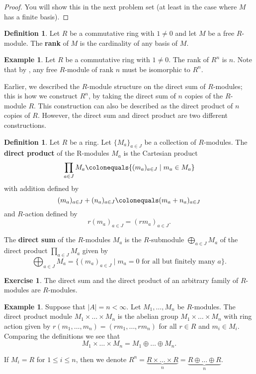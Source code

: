 \documentclass[12pt]{report}
\numberwithin{equation}{section}
\numberwithin{theorem}{chapter}
\theoremstyle{definition}
\newtheorem{definition}[theorem]{Definition}
\newtheorem{example}[theorem]{Example}
\newtheorem{exercise}{Exercise}
\newtheorem*{basic properties}{Basic Properties}
\newtheorem*{Important Remark}{Important Remark}
\newcommand{\df}[1]{{\bf #1}\index{#1}}
\begin{document}
\begin{proof}
You will show this in the next problem set (at least in the case where $M$ has a finite basis).
\end{proof}


\begin{definition}
Let $R$ be a commutative ring with $1\neq 0$ and let $M$ be a free $R$-module. The  \df{rank} of $M$ is the cardinality of any basis of $M$.
\end{definition}

\begin{example}
Let $R$ be a commutative ring with $1 \neq 0$. The rank of $R^n$ is $n$. Note that by , any free $R$-module of rank $n$ must be isomorphic to $R^n$.
\end{example}


Earlier, we described the $R$-module structure on the direct sum of $R$-modules; this is how we construct $R^n$, by taking the direct sum of $n$ copies of the $R$-module $R$. This construction can also be described as the direct product of $n$ copies of $R$. However, the direct sum and direct product are two different constructions.



\begin{definition}
Let $R$ be a ring. Let $\{ M_a \}_{a \in J}$ be a collection of $R$-modules. The \df{direct product} of the R-modules $M_a$ is the Cartesian product 
$$\prod_{a \in J} M_a \colonequals \{ (m_a)_{a \in J} \mid m_a \in M_a \}$$ 
with addition defined by 
$$(m_a)_{a \in J}+(n_a)_{a \in J} \colonequals (m_a+n_a)_{a \in J}$$
and $R$-action defined by $$r(m_a)_{a \in J} = (rm_a)_{a \in J}.$$ 

The \df{direct sum} of the $R$-modules $M_a$ is the $R$-submodule $\bigoplus_{a \in J} M_a$ of the direct product $\prod_{a \in J} M_a$ given by 
$$\bigoplus_{a \in J} M_a = \{(m_a)_{a \in J} \mid m_a = 0 \text{ for all but finitely many } a \}.$$
\end{definition}

\begin{exercise}
The direct sum and the direct product of an arbitrary family of $R$-modules are $R$-modules.
\end{exercise}

\begin{example}
Suppose that $|A| = n < \infty$. Let $M_1,\ldots,M_n$ be $R$-modules. The direct product module $M_1 \times \dots \times M_n$ is the abelian group $M_1 \times \dots \times M_n$ with ring action given by $r(m_1,\ldots,m_n) = (rm_1,\ldots,rm_n)$ for all $r \in R$ and $m_i \in M_i$.  Comparing the definitions we see  that
$$M_1 \times \dots \times M_n = M_1 \oplus \dots \oplus M_n.$$

If $M_i=R$ for $1 \leqslant i \leqslant n$, then we denote $R^n = \underbrace{R\times  \dots \times R}_n=\underbrace{R\oplus  \dots \oplus R}_n$.
\end{example}
\end{document}
